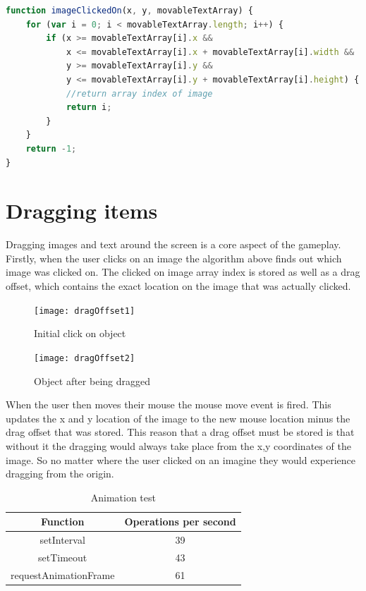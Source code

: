 \documentclass[12pt,a4paper]{report}
\begin{document}
\begin{minipage}{\linewidth}
\begin{lstlisting}[language=JavaScript]
function imageClickedOn(x, y, movableTextArray) {
    for (var i = 0; i < movableTextArray.length; i++) {
        if (x >= movableTextArray[i].x &&
            x <= movableTextArray[i].x + movableTextArray[i].width &&
            y >= movableTextArray[i].y &&
            y <= movableTextArray[i].y + movableTextArray[i].height) {
            //return array index of image
            return i;
        }
    }
    return -1;
}
\end{lstlisting}
\end{minipage}

\section{Dragging items}
Dragging images and text around the screen is a core aspect of the gameplay.
Firstly, when the user clicks on an image the algorithm above finds out which image was clicked on. The clicked on image array index is stored as well as a drag offset, which contains the exact location on the image that was actually clicked.

\begin{figure}[!h]
  \centering
  \begin{minipage}[b]{0.4\textwidth}
    \texttt{[image: dragOffset1]}
    \caption{Initial click on object}
  \end{minipage}
  \hfill
  \begin{minipage}[b]{0.4\textwidth}
    \texttt{[image: dragOffset2]}
    \caption{Object after being dragged}
  \end{minipage}
\end{figure}
\FloatBarrier


When the user then moves their mouse the mouse move event is fired. This updates the x and y location of the image to the new mouse location minus the drag offset that was stored. This reason that a drag offset must be stored is that without it the dragging would always take place from the x,y coordinates of the image. So no matter where the user clicked on an imagine they would experience dragging from the origin.


\begin{table}[ht]
\centering
\begin{adjustbox}{width=1\textwidth}
\small
\begin{tabular}{ c | c }
  \hline
 Function & Operations per second \\ \hline 
    setInterval & 39 \\
    setTimeout & 43 \\
    requestAnimationFrame & 61 \\
   \hline
\end{tabular}
\end{adjustbox}
\caption{Animation test} 
\label{table:animatetest}
\end{table} 
\end{document}
